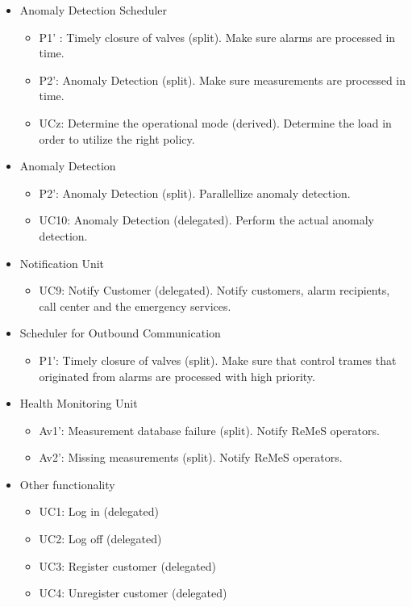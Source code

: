 \begin{itemize}
\begin{itemize}
	\end{itemize}
	\item Anomaly Detection Scheduler
	\begin{itemize}
		\item P1' : Timely closure of valves (split). Make sure alarms are processed
		in time. 
	  	\item P2': Anomaly Detection (split). Make sure measurements are processed
	  	in time. 
		\item UCz: Determine the operational mode (derived). Determine the load in
		order to utilize the right policy.
	\end{itemize}
	\item Anomaly Detection
	\begin{itemize}
		\item P2': Anomaly Detection (split). Parallellize anomaly detection.
		\item UC10: Anomaly Detection (delegated). Perform the actual anomaly
		detection.
	\end{itemize}
	\item Notification Unit
	\begin{itemize}
		\item UC9: Notify Customer (delegated). Notify customers, alarm recipients,
		call center and the emergency services. 
	\end{itemize}
	\item Scheduler for Outbound Communication
	\begin{itemize}
	  \item P1': Timely closure of valves (split). Make sure that control trames
	  that originated from alarms are processed with high priority. 
	\end{itemize}
	\item Health Monitoring Unit
	\begin{itemize}
		\item Av1': Measurement database failure (split). Notify ReMeS operators. 
		\item Av2': Missing measurements (split). Notify ReMeS operators.
	\end{itemize}
	\item Other functionality
	\begin{itemize}
	  	\item UC1: Log in (delegated)
	  	\item UC2: Log off (delegated)
	  	\item UC3: Register customer (delegated)
	  	\item UC4: Unregister customer (delegated)

\end{itemize}
\end{itemize}
